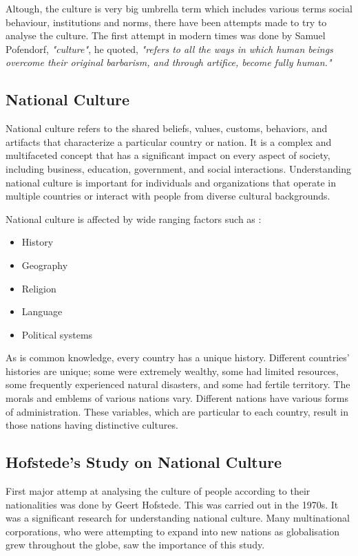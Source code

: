 \documentclass{article}
\begin{document}
Altough, the culture is very big umbrella term which includes various terms social behaviour, institutions and norms, there have been attempts made to try to analyse the culture. The first attempt in modern times was done by Samuel Pofendorf, \textit{"culture"}, he quoted, \textit{"refers to all the ways in which human beings overcome their original barbarism, and through artifice, become fully human."}

\subsection{National Culture}

National culture refers to the shared beliefs, values, customs, behaviors, and artifacts that characterize a particular country or nation. It is a complex and multifaceted concept that has a significant impact on every aspect of society, including business, education, government, and social interactions. Understanding national culture is important for individuals and organizations that operate in multiple countries or interact with people from diverse cultural backgrounds.

National culture is affected by wide ranging factors such as :
\begin{itemize}
    \item History
    \item Geography
    \item Religion
    \item Language
    \item Political systems
\end{itemize}

As is common knowledge, every country has a unique history. Different countries' histories are unique; some were extremely wealthy, some had limited resources, some frequently experienced natural disasters, and some had fertile territory. The morals and emblems of various nations vary. Different nations have various forms of administration. These variables, which are particular to each country, result in those nations having distinctive cultures.

\subsection{Hofstede's Study on National Culture}

First major attemp at analysing the culture of people according to their nationalities was done by Geert Hofstede. This was carried out in the 1970s. It was a significant research for understanding national culture. Many multinational corporations, who were attempting to expand into new nations as globalisation grew throughout the globe, saw the importance of this study.
\end{document}
